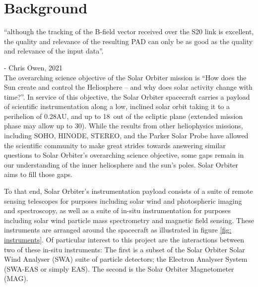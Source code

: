 \chapter{Background}
\label{chapterlabel1}

“although the tracking of the B-field vector received over the S20 link is excellent, the quality and relevance of the resulting PAD can only be as good as the quality and relevance of the input data”\cite{owen2021}. 

- Chris Owen, 2021
\\

The overarching science objective of the Solar Orbiter mission is “How does the Sun create and control the Heliosphere – and why does solar activity change with time?”\cite{muller2020}. In service of this objective, the Solar Orbiter spacecraft carries a payload of scientific instrumentation along a low, inclined solar orbit taking it to a perihelion of 0.28AU, and up to 18\degree\ out of the ecliptic plane (extended mission phase may allow up to 30\degree). While the results from other heliophysics missions, including SOHO\cite{domingo1995}, HINODE\cite{kosugi2007}, STEREO\cite{kaiser2008}, and the Parker Solar Probe\cite{fox2016} have allowed the scientific community to make great strides towards answering similar questions to Solar Orbiter's overarching science objective, some gaps remain in our understanding of the inner heliosphere and the sun's poles\cite{muller2020}. Solar Orbiter aims to fill those gaps.

To that end, Solar Orbiter's instrumentation payload consists of a suite of remote sensing telescopes for purposes including solar wind and photospheric imaging and spectroscopy, as well as a suite of in-situ instrumentation for purposes including solar wind particle mass spectrometry and magnetic field sensing. These instruments are arranged around the spacecraft as illustrated in figure \ref{fig: instruments}. Of particular interest to this project are the interactions between two of these in-situ instruments: The first is a subset of the Solar Orbiter Solar Wind Analyser (SWA) suite of particle detectors; the Electron Analyser System (SWA-EAS or simply EAS). The second is the Solar Orbiter Magnetometer (MAG).


